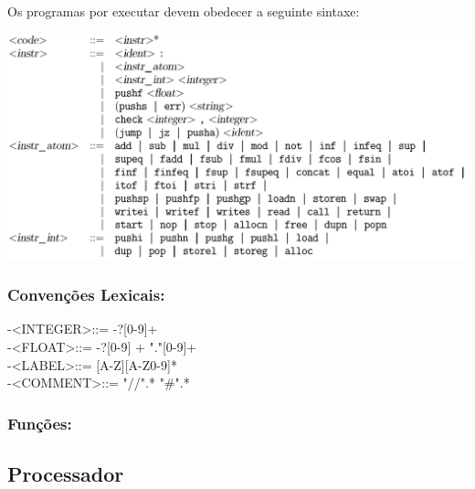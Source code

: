 \documentclass{report}
\begin{document}
\quad Os programas por executar devem obedecer a seguinte sintaxe:

\begin{center}
\includegraphics[width=\textwidth]{sintaxe.png}
\end{center}


\subsubsection{Convenções Lexicais:}

 -\quad \textless INTEGER\textgreater \quad ::= -?[0-9]+\\
 -\quad \textless FLOAT\textgreater   \quad ::= -?[0-9] + "."[0-9]+\\
 -\quad \textless LABEL\textgreater   \quad ::= [A-Z][A-Z0-9]* \\
 -\quad \textless COMMENT\textgreater \quad ::= "//".* \quad \textbar \quad "\#".*\\

\subsubsection{Funções:}




\subsection{Processador}
\end{document}
